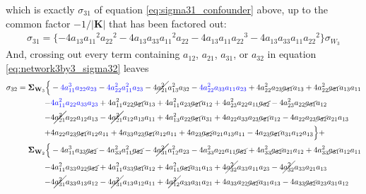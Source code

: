 \documentclass{article}
\begin{document}
which is exactly $\sigma_{31}$ of equation \ref{eq:sigma31_confounder} above, up to the common factor $-1/|\mathbf{K}|$ that has been factored out:
\begin{align*}
\sigma_{31}= \{ -4a_{13}{a_{11}}^2{a_{22}}^2-4a_{13}a_{33}{a_{11}}^2a_{22}-4a_{13}a_{11}{a_{22}}^3-4a_{13}a_{33}a_{11}{a_{22}}^2 \} \sigma_{W_{3}}
\end{align*}
And, crossing out every term containing $a_{12}$, $a_{21}$, $a_{31}$, or $a_{32}$ in equation \ref{eq:network3by3_sigma32} leaves
\begin{equation}
\begin{aligned}
\sigma_{32} =  \mathbf{\Sigma}_{\textbf{W}_{3}} \Bigl\{ & -\textcolor{blue}{4 a_{11}^{3} a_{22} a_{23}} - \textcolor{blue}{4 a_{22}^{2} a_{11}^{2} a_{23}} - 4 \cancel{a_{21}^{2}} a_{13}^{2} a_{32} - \textcolor{blue}{4 a_{22}^{2} a_{33} a_{11} a_{23}} + 4 a_{22}^{2} a_{23} \cancel{a_{31}} a_{13} + 4 a_{22}^{2} \cancel{a_{21}} a_{13} a_{11} \\
-& \textcolor{blue}{4 a_{11}^{2} a_{22} a_{33} a_{23}} + 4 a_{11}^{2} a_{22} \cancel{a_{21}} a_{13} + 4 a_{11}^{2} a_{23} \cancel{a_{21}} a_{12} + 4 a_{23}^{2} a_{22} a_{11} \cancel{a_{32}} - 4a_{23}^{2} a_{22} \cancel{a_{31}} a_{12} \\
-& 4 \cancel{a_{21}^{2}} a_{22} a_{12} a_{13} - 4 \cancel{a_{21}^{2}} a_{12} a_{13} a_{11} + 4 a_{13}^{2} a_{22} \cancel{a_{21}} a_{31} + 4 a_{22} a_{33} a_{23} \cancel{a_{21}} a_{12} - 4 a_{22} a_{23}\cancel{a_{32}} a_{21} a_{13} \\
+& 4 a_{22} a_{23} \cancel{a_{21}} a_{12} a_{11} + 4 a_{33} a_{23} \cancel{a_{21}} a_{12} a_{11} + 4 a_{23} \cancel{a_{32}} a_{21} a_{13} a_{11} - 4 a_{23} \cancel{a_{21}} a_{31} a_{12} a_{13}\Bigr\} + \\
\mathbf{\Sigma}_{\textbf{W}_{2}} \Bigl\{& -4 a_{11}^{3} a_{33} \cancel{a_{32}} - 4 a_{33}^{2} a_{11}^{2} \cancel{a_{32}} - 4 \cancel{a_{31}^{2}} a_{12}^{2} a_{23} - 4 a_{33}^{2} a_{22} a_{11} \cancel{a_{32}} + 4 a_{33}^{2} \cancel{a_{32}} a_{21} a_{12} + 4 a_{33}^{2} \cancel{a_{31}} a_{12} a_{11} \\
-& 4 a_{11}^{2} a_{33} a_{22} \cancel{a_{32}} + 4 a_{11}^{2} a_{33} \cancel{a_{31}} a_{12} + 4 a_{11}^{2} \cancel{a_{32}} a_{31} a_{13} + 4 \cancel{a_{32}^{2}} a_{33} a_{11} a_{23} - 4 \cancel{a_{32}^{2}} a_{33} a_{21} a_{13} \\
-& 4 \cancel{a_{31}^{2}} a_{33} a_{13} a_{12} - 4 \cancel{a_{31}^{2}} a_{13} a_{12} a_{11} + 4 \cancel{a_{12}^{2}} a_{33} a_{31} a_{21} + 4 a_{33} a_{22} \cancel{a_{32}} a_{31} a_{13} - 4 a_{33} \cancel{a_{32}} a_{23} a_{31} a_{12} \\

\end{aligned}
\end{equation}
\end{document}

